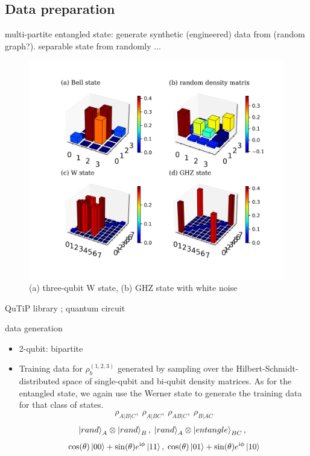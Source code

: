 \documentclass[
10pt,
aps,
pra,
linenumbers,
floatfix,
]{revtex4-2}
\theoremstyle{plain}
\theoremstyle{definition}
\newcommand{\dm}{\rho}
\begin{document}
\subsection{Data preparation}
multi-partite entangled state: generate synthetic (engineered) data from (random graph?).
separable state from randomly ...
\begin{figure}[!ht]
	\centering
	\includegraphics[width=.5\linewidth]{./notebook/dataset_sample.png}
	\caption{(a) three-qubit W state, (b) GHZ state with white noise}
\end{figure}
QuTiP library \cite{johanssonQuTiPPythonFramework2013}; quantum circuit \cite{liPulselevelNoisyQuantum2022}

data generation
\begin{itemize}
	\item 2-qubit: bipartite
	\item Training data for $\dm_b^{(1,2,3)}$ generated by sampling over the Hilbert-Schmidt-distributed space of single-qubit and bi-qubit density matrices. As for the entangled state, we again use the Werner state to generate the training data for that class of states.
	\begin{equation}
		\dm_{A|B|C},\;
		\dm_{A|BC},\;
		\dm_{AB|C},\;
		\dm_{B|AC}
	\end{equation}
	\begin{equation}
		\ket{rand}_A \otimes \ket{rand}_B,\;
		\ket{rand}_A \otimes \ket{entangle}_{BC},\;
	\end{equation}
	\begin{equation}
		\cos(\theta) \ket{00} + \sin(\theta)e^{\textup{i} \phi} \ket{11}
		,\;
		\cos(\theta) \ket{01} + \sin(\theta)e^{\textup{i} \phi} \ket{10}
	\end{equation}
\end{itemize}
\end{document}
